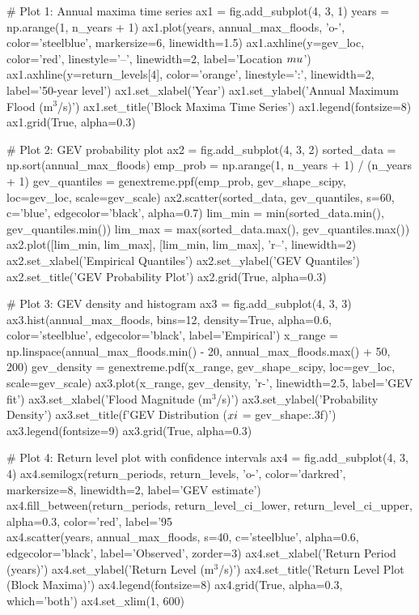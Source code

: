 \documentclass[a4paper, 11pt]{article}
\begin{document}
\begin{pycode}
# Plot 1: Annual maxima time series
ax1 = fig.add_subplot(4, 3, 1)
years = np.arange(1, n_years + 1)
ax1.plot(years, annual_max_floods, 'o-', color='steelblue', markersize=6, linewidth=1.5)
ax1.axhline(y=gev_loc, color='red', linestyle='--', linewidth=2, label='Location $\\mu$')
ax1.axhline(y=return_levels[4], color='orange', linestyle=':', linewidth=2, label='50-year level')
ax1.set_xlabel('Year')
ax1.set_ylabel('Annual Maximum Flood (m$^3$/s)')
ax1.set_title('Block Maxima Time Series')
ax1.legend(fontsize=8)
ax1.grid(True, alpha=0.3)

# Plot 2: GEV probability plot
ax2 = fig.add_subplot(4, 3, 2)
sorted_data = np.sort(annual_max_floods)
emp_prob = np.arange(1, n_years + 1) / (n_years + 1)
gev_quantiles = genextreme.ppf(emp_prob, gev_shape_scipy, loc=gev_loc, scale=gev_scale)
ax2.scatter(sorted_data, gev_quantiles, s=60, c='blue', edgecolor='black', alpha=0.7)
lim_min = min(sorted_data.min(), gev_quantiles.min())
lim_max = max(sorted_data.max(), gev_quantiles.max())
ax2.plot([lim_min, lim_max], [lim_min, lim_max], 'r--', linewidth=2)
ax2.set_xlabel('Empirical Quantiles')
ax2.set_ylabel('GEV Quantiles')
ax2.set_title('GEV Probability Plot')
ax2.grid(True, alpha=0.3)

# Plot 3: GEV density and histogram
ax3 = fig.add_subplot(4, 3, 3)
ax3.hist(annual_max_floods, bins=12, density=True, alpha=0.6, color='steelblue',
         edgecolor='black', label='Empirical')
x_range = np.linspace(annual_max_floods.min() - 20, annual_max_floods.max() + 50, 200)
gev_density = genextreme.pdf(x_range, gev_shape_scipy, loc=gev_loc, scale=gev_scale)
ax3.plot(x_range, gev_density, 'r-', linewidth=2.5, label='GEV fit')
ax3.set_xlabel('Flood Magnitude (m$^3$/s)')
ax3.set_ylabel('Probability Density')
ax3.set_title(f'GEV Distribution ($\\xi$ = {gev_shape:.3f})')
ax3.legend(fontsize=9)
ax3.grid(True, alpha=0.3)

# Plot 4: Return level plot with confidence intervals
ax4 = fig.add_subplot(4, 3, 4)
ax4.semilogx(return_periods, return_levels, 'o-', color='darkred', markersize=8,
             linewidth=2, label='GEV estimate')
ax4.fill_between(return_periods, return_level_ci_lower, return_level_ci_upper,
                  alpha=0.3, color='red', label='95\\%
ax4.scatter(years, annual_max_floods, s=40, c='steelblue', alpha=0.6, edgecolor='black',
           label='Observed', zorder=3)
ax4.set_xlabel('Return Period (years)')
ax4.set_ylabel('Return Level (m$^3$/s)')
ax4.set_title('Return Level Plot (Block Maxima)')
ax4.legend(fontsize=8)
ax4.grid(True, alpha=0.3, which='both')
ax4.set_xlim(1, 600)


\end{pycode}
\end{document}
